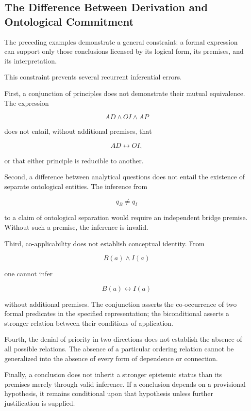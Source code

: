 \subsection{The Difference Between Derivation and Ontological
Commitment}

The preceding examples demonstrate a general constraint: a
formal expression can support only those conclusions licensed by
its logical form, its premises, and its interpretation.

This constraint prevents several recurrent inferential errors.

First, a conjunction of principles does not demonstrate their
mutual equivalence. The expression

\[
    AD \land OI \land AP
\]

does not entail, without additional premises, that

\[
    AD \leftrightarrow OI,
\]

or that either principle is reducible to another.

Second, a difference between analytical questions does not entail
the existence of separate ontological entities. The inference from

\[
    q_B \neq q_I
\]

to a claim of ontological separation would require an independent
bridge premise. Without such a premise, the inference is invalid.

Third, co-applicability does not establish conceptual identity.
From

\[
    B(a) \land I(a)
\]

one cannot infer

\[
    B(a) \leftrightarrow I(a)
\]

without additional premises. The conjunction asserts the
co-occurrence of two formal predicates in the specified
representation; the biconditional asserts a stronger relation
between their conditions of application.

Fourth, the denial of priority in two directions does not establish
the absence of all possible relations. The absence of a particular
ordering relation cannot be generalized into the absence of every
form of dependence or connection.

Finally, a conclusion does not inherit a stronger epistemic status
than its premises merely through valid inference. If a conclusion
depends on a provisional hypothesis, it remains conditional upon
that hypothesis unless further justification is supplied.

